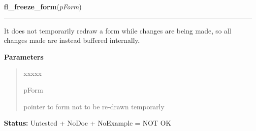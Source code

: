 \hspace{.8\funcindent}\begin{boxedminipage}{\funcwidth}

    \raggedright \textbf{fl\_freeze\_form}(\textit{pForm})

    \vspace{-1.5ex}

    \rule{\textwidth}{0.5\fboxrule}
\setlength{\parskip}{2ex}
    It does not temporarily redraw a form while changes are being made, so 
    all changes made are instead buffered internally.

\setlength{\parskip}{1ex}
      \textbf{Parameters}
      \vspace{-1ex}

      \begin{quote}
        \begin{Ventry}{xxxxx}

          \item[pForm]

          pointer to form not to be re-drawn temporarly

        \end{Ventry}

      \end{quote}

\textbf{Status:} Untested + NoDoc + NoExample = NOT OK



    \end{boxedminipage}

    \label{xformslib:library:fl_set_focus_object}

    \vspace{0.5ex}

